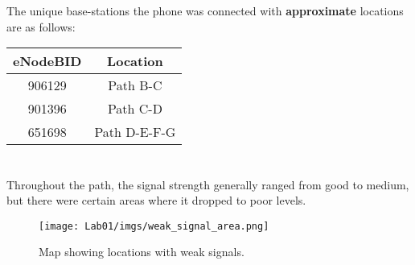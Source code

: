 \documentclass[a4paper, 11pt]{article}
\begin{document}
\newpage
\section{}
The unique base-stations the phone was connected with \textbf{approximate} locations are as follows:

\vspace{0.5cm}

\begin{center}
\renewcommand{\arraystretch}{1.5} %
    \begin{tabular}{|c|c|}
        \hline
        \hspace{0.5cm}\textbf{eNodeBID}\hspace{0.5cm} & \hspace{0.5cm}\textbf{Location}\hspace{0.5cm} \\
        \hline
        \hspace{0.5cm}906129\hspace{0.5cm} & \hspace{0.5cm}Path B-C\hspace{0.5cm} \\
        \hline
        \hspace{0.5cm}901396\hspace{0.5cm} & \hspace{0.5cm}Path C-D\hspace{0.5cm} \\
        \hline
        \hspace{0.5cm}651698\hspace{0.5cm} & \hspace{0.5cm}Path D-E-F-G\hspace{0.5cm} \\
        \hline
    \end{tabular}
\end{center}

\vspace{0.25cm}

\section{}

Throughout the path, the signal strength generally ranged from good to medium, but there were certain areas where it dropped to poor levels. \\

\begin{wrapfigure}[6]{r}{0.3\textwidth} %
    \centering
    \vspace{-0.95cm}
    \texttt{[image: Lab01/imgs/weak\_signal\_area.png]}
    \caption{Map showing locations with weak signals.}
\end{wrapfigure}
\end{document}
